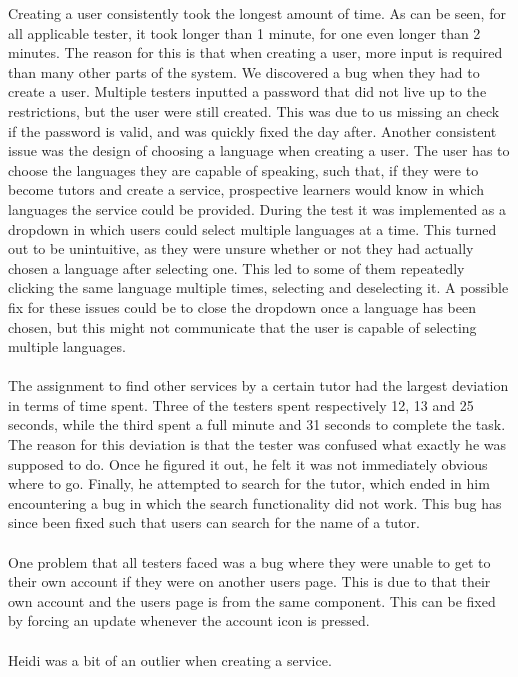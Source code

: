 Creating a user consistently took the longest amount of time.
As can be seen, for all applicable tester, it took longer than 1 minute, for one even longer than 2 minutes.
The reason for this is that when creating a user, more input is required than many other parts of the system.
We discovered a bug when they had to create a user. 
Multiple testers inputted a password that did not live up to the restrictions, but the user were still created. 
This was due to us missing an check if the password is valid, and was quickly fixed the day after.
Another consistent issue was the design of choosing a language when creating a user.
The user has to choose the languages they are capable of speaking, such that, if they were to become tutors and create a service, prospective learners would know in which languages the service could be provided.
During the test it was implemented as a dropdown in which users could select multiple languages at a time.
This turned out to be unintuitive, as they were unsure whether or not they had actually chosen a language after selecting one.
This led to some of them repeatedly clicking the same language multiple times, selecting and deselecting it.
A possible fix for these issues could be to close the dropdown once a language has been chosen, but this might not communicate that the user is capable of selecting multiple languages.
\\\\
The assignment to find other services by a certain tutor had the largest deviation in terms of time spent.
Three of the testers spent respectively 12, 13 and 25 seconds, while the third spent a full minute and 31 seconds to complete the task.
The reason for this deviation is that the tester was confused what exactly he was supposed to do.
Once he figured it out, he felt it was not immediately obvious where to go.
Finally, he attempted to search for the tutor, which ended in him encountering a bug in which the search functionality did not work.
This bug has since been fixed such that users can search for the name of a tutor.
\\\\
One problem that all testers faced was a bug where they were unable to get to their own account if they were on another users page.
This is due to that their own account and the users page is from the same component.
This can be fixed by forcing an update whenever the account icon is pressed.
\\\\
Heidi was a bit of an outlier when creating a service.
